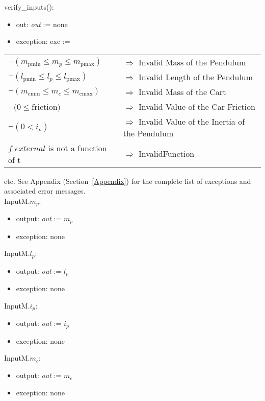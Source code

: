\documentclass[12pt, titlepage]{article}
\begin{document}
\noindent verify\_inputs():
\begin{itemize}
\item out: \textit{out} := none
\item exception: exc := 
\end{itemize}

\noindent \begin{longtable*}[l]{l l} 
$\neg (m_{\text{pmin}} \leq m_p \leq m_{\text{pmax}})$ & $\Rightarrow$ Invalid Mass of the Pendulum\\

$\neg (l_{\text{pmin}} \leq l_p \leq l_{\text{pmax}})$& $\Rightarrow$  Invalid Length of the Pendulum\\
$\neg (m_{\text{cmin}} \leq m_c\leq m_{\text{cmax}})$ & $\Rightarrow$  Invalid Mass of the Cart \\
$\neg (0 \leq $friction$)$ & $\Rightarrow$ Invalid Value of the Car Friction\\
$\neg  (0 < i_p)$ & $\Rightarrow$ Invalid Value of the Inertia of the Pendulum\\
$f\_external$ is not a function of t & $\Rightarrow$ InvalidFunction\\
\end{longtable*}
etc.  See Appendix (Section~\ref{Appendix}) for the complete list of exceptions and associated error messages.\\
\newline
\noindent InputM.$m_p$:
\begin{itemize}
\item output: \textit{out} := $m_p$
\item exception: none
\end{itemize}

\noindent InputM.$l_p$:
\begin{itemize}
\item output: \textit{out} := $l_p$
\item exception: none
\end{itemize}
\noindent InputM.$i_p$:
\begin{itemize}
\item output: \textit{out} := $i_p$
\item exception: none
\end{itemize}
\noindent InputM.$m_c$:
\begin{itemize}
\item output: \textit{out} := $m_c$
\item exception: none
\end{itemize}
\end{document}
